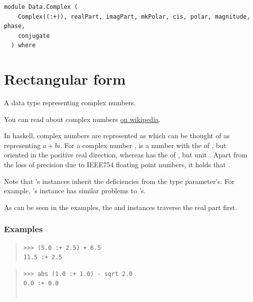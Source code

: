 \label{module:Data.Complex}
\haddockbeginheader
{\haddockverb\begin{verbatim}
module Data.Complex (
    Complex((:+)), realPart, imagPart, mkPolar, cis, polar, magnitude, phase,
    conjugate
  ) where\end{verbatim}}
\haddockendheader

\section{Rectangular form}
\begin{haddockdesc}
\item[\begin{tabular}{@{}l}
data Complex a
\end{tabular}]
{\haddockbegindoc
A data type representing complex numbers.\par
You can read about complex numbers \href{https://en.wikipedia.org/wiki/Complex_number}{on wikipedia}.\par
In haskell, complex numbers are represented as  which can be thought of
 as representing \(a + bi\). For a complex number ,  is a number with the  of ,
 but oriented in the positive real direction, whereas 
 has the  of , but unit .
 Apart from the loss of precision due to IEEE754 floating point numbers,
 it holds that .\par
Note that 's instances inherit the deficiencies from the type
 parameter's. For example, 's  instance has similar
 problems to 's.\par
As can be seen in the examples, the 
 and  instances traverse the real part first.\par
\subsubsection*{\textbf{Examples}}
\begin{quote}
{\haddockverb\begin{verbatim}
>>> (5.0 :+ 2.5) + 6.5
11.5 :+ 2.5

\end{verbatim}}
\end{quote}
\begin{quote}
{\haddockverb\begin{verbatim}
>>> abs (1.0 :+ 1.0) - sqrt 2.0
0.0 :+ 0.0


\end{verbatim}}
\end{quote}}
\end{haddockdesc}
